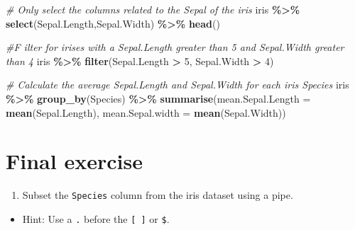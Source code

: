 \documentclass[
]{book}
\newenvironment{Shaded}{\begin{snugshade}}{\end{snugshade}}
\newcommand{\AttributeTok}[1]{\textcolor[rgb]{0.13,0.29,0.53}{#1}}
\newcommand{\CommentTok}[1]{\textcolor[rgb]{0.56,0.35,0.01}{\textit{#1}}}
\newcommand{\DecValTok}[1]{\textcolor[rgb]{0.00,0.00,0.81}{#1}}
\newcommand{\FunctionTok}[1]{\textcolor[rgb]{0.13,0.29,0.53}{\textbf{#1}}}
\newcommand{\NormalTok}[1]{#1}
\newcommand{\SpecialCharTok}[1]{\textcolor[rgb]{0.81,0.36,0.00}{\textbf{#1}}}
\providecommand{\tightlist}{%
  \setlength{\itemsep}{0pt}\setlength{\parskip}{0pt}}
\begin{document}
\begin{Shaded}
\begin{Highlighting}[]
\CommentTok{\# Only select the columns related to the Sepal of the iris}
\NormalTok{iris }\SpecialCharTok{\%\textgreater{}\%}
  \FunctionTok{select}\NormalTok{(Sepal.Length,Sepal.Width) }\SpecialCharTok{\%\textgreater{}\%}
  \FunctionTok{head}\NormalTok{()}
\end{Highlighting}
\end{Shaded}

\begin{Shaded}
\begin{Highlighting}[]
\CommentTok{\#F ilter for irises with a Sepal.Length greater than 5 and Sepal.Width greater than 4}
\NormalTok{iris }\SpecialCharTok{\%\textgreater{}\%}
  \FunctionTok{filter}\NormalTok{(Sepal.Length }\SpecialCharTok{\textgreater{}} \DecValTok{5}\NormalTok{, Sepal.Width }\SpecialCharTok{\textgreater{}} \DecValTok{4}\NormalTok{)}
\end{Highlighting}
\end{Shaded}

\begin{Shaded}
\begin{Highlighting}[]
\CommentTok{\# Calculate the average Sepal.Length and Sepal.Width for each iris Species}
\NormalTok{iris }\SpecialCharTok{\%\textgreater{}\%}
  \FunctionTok{group\_by}\NormalTok{(Species) }\SpecialCharTok{\%\textgreater{}\%}
  \FunctionTok{summarise}\NormalTok{(}\AttributeTok{mean.Sepal.Length =} \FunctionTok{mean}\NormalTok{(Sepal.Length), }\AttributeTok{mean.Sepal.width =} \FunctionTok{mean}\NormalTok{(Sepal.Width))}
\end{Highlighting}
\end{Shaded}

\section{Final exercise}\label{final-exercise-1}

\begin{enumerate}
\def\labelenumi{\arabic{enumi}.}
\tightlist
\item
  Subset the \texttt{Species} column from the iris dataset using a pipe.
\end{enumerate}

\begin{itemize}
\tightlist
\item
  Hint: Use a \texttt{.} before the \texttt{{[}\ {]}} or \texttt{\$}.
\end{itemize}
\end{document}
